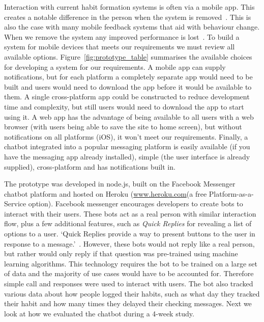 Interaction with current habit formation systems is often via a mobile app. This creates a notable difference in the person when the system is removed~\cite{article_my_phone_is_part_of_my_soul}.
This is also the case with many mobile feedback systems that aid with behaviour change.
When we remove the system any improved performance is lost~\cite{article_dont_kick_habit, article_realtime_feedback_improving_medication_taking}. To build a system for mobile devices that meets our requirements we must review all available options.\newline
\newline
Figure~\ref{fig:prototype_table} summarises the available choices for developing a system for our requirements. A mobile app can supply notifications, but for each platform a completely separate app would need to be built and users would need to download the app before it would be available to them.\newline
A single cross-platform app could be constructed to reduce development time and complexity, but still users would need to download the app to start using it.\newline
A web app has the advantage of being available to all users with a web browser (with users being able to save the site to home screen), but without notifications on all platforms (iOS), it won't meet our requirements.\newline
Finally, a chatbot integrated into a popular messaging platform is easily available (if you have the messaging app already installed), simple (the user interface is already supplied), cross-platform and has notifications built in.


The prototype was developed in node.js, built on the Facebook Messenger chatbot platform and hosted on Heroku (\url{www.heroku.com}(a free Platform-as-a-Service option). Facebook messenger encourages developers to create bots to interact with their users. These bots act as a real person with similar interaction flow, plus a few additional features, such as \textit{Quick Replies} for revealing a list of options to a user. `Quick Replies provide a way to present buttons to the user in response to a message.'~\cite{doc_fb_quick_replies}. However, these bots would not reply like a real person, but rather would only reply if that question was pre-trained using machine learning algorithms. This technology requires the bot to be trained on a large set of data and the majority of use cases would have to be accounted for. Therefore simple call and responses were used to interact with users. The bot also tracked various data about how people logged their habits, such as what day they tracked their habit and how many times they delayed their checking messages. Next we look at how we evaluated the chatbot during a 4-week study.

